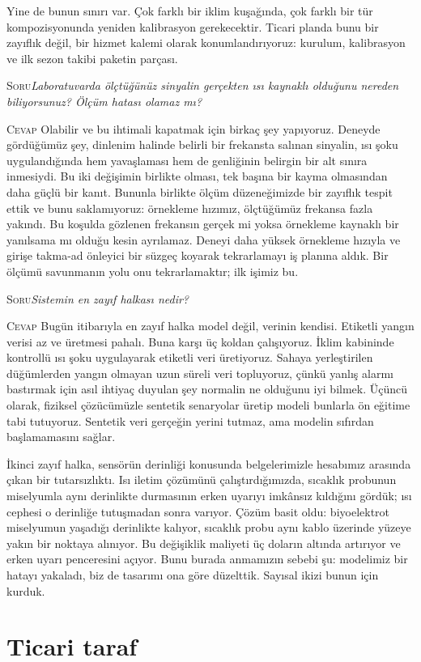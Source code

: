 \documentclass[11pt,a4paper]{article}
\newcommand{\soru}[1]{%
  \par\vskip 15pt plus 4pt minus 2pt
  \noindent\textcolor{ember}{\textsc{Soru}}\quad\emph{#1}%
  \par\vskip 6pt\noindent\textcolor{myco}{\textsc{Cevap}}\quad\ignorespaces}
\begin{document}
Yine de bunun sınırı var. Çok farklı bir iklim kuşağında, çok farklı
bir tür kompozisyonunda yeniden kalibrasyon gerekecektir. Ticari planda
bunu bir zayıflık değil, bir hizmet kalemi olarak konumlandırıyoruz:
kurulum, kalibrasyon ve ilk sezon takibi paketin parçası.

\soru{Laboratuvarda ölçtüğünüz sinyalin gerçekten ısı kaynaklı olduğunu
nereden biliyorsunuz? Ölçüm hatası olamaz mı?}
Olabilir ve bu ihtimali kapatmak için birkaç şey yapıyoruz. Deneyde
gördüğümüz şey, dinlenim halinde belirli bir frekansta salınan sinyalin,
ısı şoku uygulandığında hem yavaşlaması hem de genliğinin belirgin bir
alt sınıra inmesiydi. Bu iki değişimin birlikte olması, tek başına bir
kayma olmasından daha güçlü bir kanıt. Bununla birlikte ölçüm
düzeneğimizde bir zayıflık tespit ettik ve bunu saklamıyoruz: örnekleme
hızımız, ölçtüğümüz frekansa fazla yakındı. Bu koşulda gözlenen
frekansın gerçek mi yoksa örnekleme kaynaklı bir yanılsama mı olduğu
kesin ayrılamaz. Deneyi daha yüksek örnekleme hızıyla ve girişe
takma-ad önleyici bir süzgeç koyarak tekrarlamayı iş planına aldık.
Bir ölçümü savunmanın yolu onu tekrarlamaktır; ilk işimiz bu.

\soru{Sistemin en zayıf halkası nedir?}
Bugün itibarıyla en zayıf halka model değil, verinin kendisi. Etiketli
yangın verisi az ve üretmesi pahalı. Buna karşı üç koldan çalışıyoruz.
İklim kabininde kontrollü ısı şoku uygulayarak etiketli veri üretiyoruz.
Sahaya yerleştirilen düğümlerden yangın olmayan uzun süreli veri
topluyoruz, çünkü yanlış alarmı bastırmak için asıl ihtiyaç duyulan şey
normalin ne olduğunu iyi bilmek. Üçüncü olarak, fiziksel çözücümüzle
sentetik senaryolar üretip modeli bunlarla ön eğitime tabi tutuyoruz.
Sentetik veri gerçeğin yerini tutmaz, ama modelin sıfırdan başlamamasını
sağlar.

İkinci zayıf halka, sensörün derinliği konusunda belgelerimizle
hesabımız arasında çıkan bir tutarsızlıktı. Isı iletim çözümünü
çalıştırdığımızda, sıcaklık probunun miselyumla aynı derinlikte
durmasının erken uyarıyı imkânsız kıldığını gördük; ısı cephesi o
derinliğe tutuşmadan sonra varıyor. Çözüm basit oldu: biyoelektrot
miselyumun yaşadığı derinlikte kalıyor, sıcaklık probu aynı kablo
üzerinde yüzeye yakın bir noktaya alınıyor. Bu değişiklik maliyeti üç
doların altında artırıyor ve erken uyarı penceresini açıyor. Bunu
burada anmamızın sebebi şu: modelimiz bir hatayı yakaladı, biz de
tasarımı ona göre düzelttik. Sayısal ikizi bunun için kurduk.

\section*{Ticari taraf}
\end{document}
